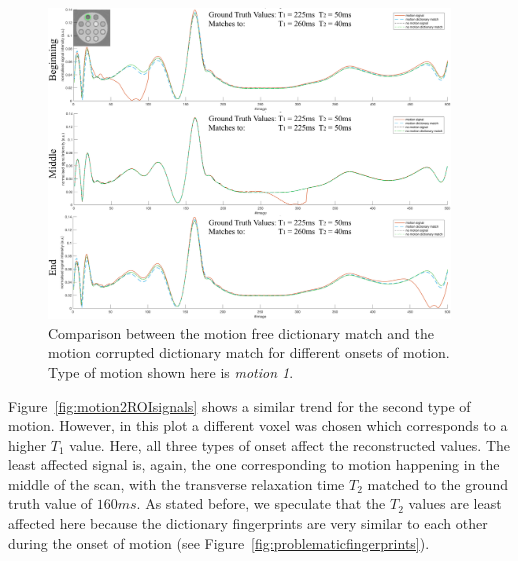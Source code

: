 \begin{figure}[ht]
    \centering
    \includegraphics[width=0.95\textwidth]{images/mrf/motion1ROIsignals}
    \caption{Comparison between the motion free dictionary match and the motion corrupted dictionary match for different onsets of motion. Type of motion shown here is \textit{motion 1}.}
    \label{fig:motion1ROIsignals}
\end{figure}

\hfill

Figure~\ref{fig:motion2ROIsignals} shows a similar trend for the second type of motion.
However, in this plot a different voxel was chosen which corresponds to a higher $T_1$ value.
Here, all three types of onset affect the reconstructed values.
The least affected signal is, again, the one corresponding to motion happening in the middle of the scan, with the transverse relaxation time $T_2$ matched to the ground truth value of $160ms$.
As stated before, we speculate that the $T_2$ values are least affected here because the dictionary fingerprints are very similar to each other during the onset of motion (see  Figure~\ref{fig:problematicfingerprints}).

